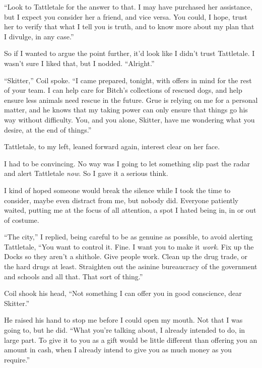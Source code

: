 ``Look to Tattletale for the answer to that.  I may have purchased her assistance, but I expect you consider her a friend, and vice versa.  You could, I hope, trust her to verify that what I tell you is truth, and to know more about my plan that I divulge, in any case.''



So if I wanted to argue the point further, it'd look like I didn't trust Tattletale.  I wasn't sure I liked that, but I nodded.  ``Alright.''



``Skitter,'' Coil spoke.  ``I came prepared, tonight, with offers in mind for the rest of your team.  I can help care for Bitch's collections of rescued dogs, and help ensure less animals need rescue in the future.  Grue is relying on me for a personal matter, and he knows that my taking power can only ensure that things go his way without difficulty. You, and you alone, Skitter, have me wondering what you desire, at the end of things.''



Tattletale, to my left, leaned forward again, interest clear on her face.



I had to be convincing.  No way was I going to let something slip past the radar and alert Tattletale \emph{now}.  So I gave it a serious think.



I kind of hoped someone would break the silence while I took the time to consider, maybe even distract from me, but nobody did.  Everyone patiently waited, putting me at the focus of all attention, a spot I hated being in, in or out of costume.



``The city,'' I replied, being careful to be as genuine as possible, to avoid alerting Tattletale, ``You want to control it.  Fine.  I want you to make it \emph{work}.  Fix up the Docks so they aren't a shithole.  Give people work.  Clean up the drug trade, or the hard drugs at least.  Straighten out the asinine bureaucracy of the government and schools and all that.  That sort of thing.''



Coil shook his head, ``Not something I can offer you in good conscience, dear Skitter.''



He raised his hand to stop me before I could open my mouth.  Not that I was going to, but he did.  ``What you're talking about, I already intended to do, in large part. To give it to you as a gift would be little different than offering you an amount in cash, when I already intend to give you as much money as you require.''



